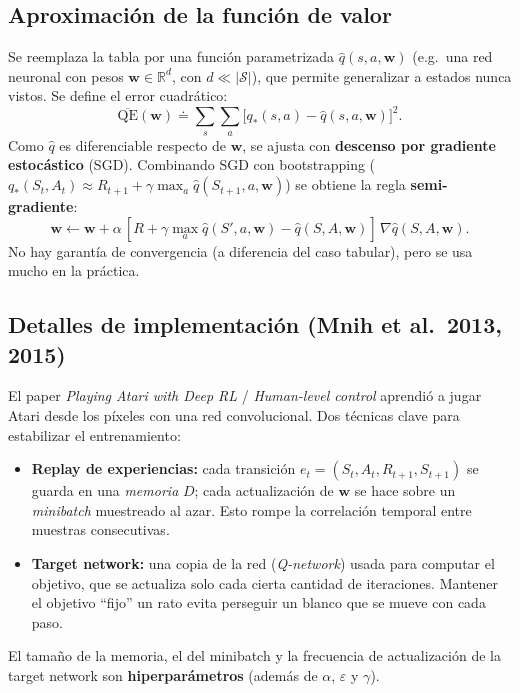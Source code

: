 \documentclass[11pt, a4paper]{article}
\begin{document}
\subsection{Aproximaci\'on de la funci\'on de valor}
Se reemplaza la tabla por una funci\'on parametrizada $\hat q(s, a, \mathbf{w})$ (e.g.\ una red neuronal con pesos $\mathbf{w} \in \mathbb{R}^d$, con $d \ll |\mathcal{S}|$), que permite generalizar a estados nunca vistos. Se define el error cuadr\'atico:
\[
    \overline{\text{QE}}(\mathbf{w}) \doteq \sum_{s}\sum_{a} \big[q_*(s,a) - \hat q(s, a, \mathbf{w})\big]^2.
\]
Como $\hat q$ es diferenciable respecto de $\mathbf{w}$, se ajusta con \textbf{descenso por gradiente estoc\'astico} (SGD). Combinando SGD con bootstrapping ($q_*(S_t, A_t) \approx R_{t+1} + \gamma \max_a \hat q(S_{t+1}, a, \mathbf{w})$) se obtiene la regla \textbf{semi-gradiente}:
\[
    \mathbf{w} \leftarrow \mathbf{w} + \alpha\,[R + \gamma \max_a \hat q(S', a, \mathbf{w}) - \hat q(S, A, \mathbf{w})]\,\nabla \hat q(S, A, \mathbf{w}).
\]
No hay garant\'ia de convergencia (a diferencia del caso tabular), pero se usa mucho en la pr\'actica.

\subsection{Detalles de implementaci\'on (Mnih et al.\ 2013, 2015)}
El paper \textit{Playing Atari with Deep RL} / \textit{Human-level control} aprendi\'o a jugar Atari desde los p\'ixeles con una red convolucional. Dos t\'ecnicas clave para estabilizar el entrenamiento:
\begin{itemize}[nosep]
    \item \textbf{Replay de experiencias:} cada transici\'on $e_t = (S_t, A_t, R_{t+1}, S_{t+1})$ se guarda en una \emph{memoria} $D$; cada actualizaci\'on de $\mathbf{w}$ se hace sobre un \emph{minibatch} muestreado al azar. Esto rompe la correlaci\'on temporal entre muestras consecutivas.
    \item \textbf{Target network:} una copia de la red (\emph{Q-network}) usada para computar el objetivo, que se actualiza solo cada cierta cantidad de iteraciones. Mantener el objetivo ``fijo'' un rato evita perseguir un blanco que se mueve con cada paso.
\end{itemize}
El tama\~no de la memoria, el del minibatch y la frecuencia de actualizaci\'on de la target network son \textbf{hiperpar\'ametros} (adem\'as de $\alpha$, $\varepsilon$ y $\gamma$).

\end{document}

